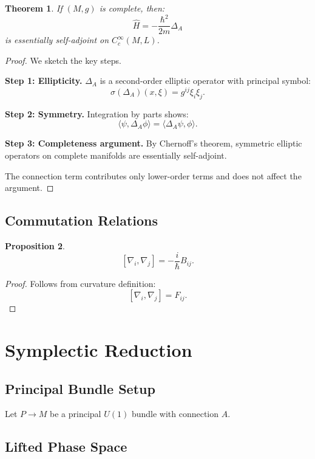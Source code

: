 \documentclass[11pt]{article}
\newtheorem{theorem}{Theorem}[section]
\newtheorem{proposition}[theorem]{Proposition}
\begin{document}
\begin{theorem}
If $(M,g)$ is complete, then:
\[
\hat{H} = -\frac{\hbar^2}{2m}\Delta_A
\]
is essentially self-adjoint on $C_c^\infty(M,L)$.
\end{theorem}

\begin{proof}
We sketch the key steps.

\textbf{Step 1: Ellipticity.}  
$\Delta_A$ is a second-order elliptic operator with principal symbol:
\[
\sigma(\Delta_A)(x,\xi)=g^{ij}\xi_i\xi_j.
\]

\textbf{Step 2: Symmetry.}  
Integration by parts shows:
\[
\langle \psi, \Delta_A \phi \rangle = \langle \Delta_A \psi, \phi \rangle.
\]

\textbf{Step 3: Completeness argument.}  
By Chernoff's theorem, symmetric elliptic operators on complete manifolds are essentially self-adjoint.

The connection term contributes only lower-order terms and does not affect the argument.
\end{proof}

\subsection{Commutation Relations}

\begin{proposition}
\[
[\nabla_i,\nabla_j] = -\frac{i}{\hbar} B_{ij}.
\]
\end{proposition}

\begin{proof}
Follows from curvature definition:
\[
[\nabla_i,\nabla_j] = F_{ij}.
\]
\end{proof}

\section{Symplectic Reduction}

\subsection{Principal Bundle Setup}

Let $P \to M$ be a principal $U(1)$ bundle with connection $A$.

\subsection{Lifted Phase Space}
\end{document}
